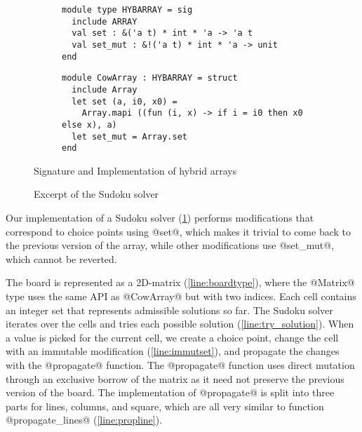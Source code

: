 \begin{figure}[tp]
  \centering
  \begin{subfigure}[t]{0.45\linewidth}
\begin{lstlisting}
module type HYBARRAY = sig
  include ARRAY
  val set : &('a t) * int * 'a -> 'a t
  val set_mut : &!('a t) * int * 'a -> unit
end
\end{lstlisting}
  \end{subfigure}\hfill
  \begin{subfigure}[t]{0.55\linewidth}
\begin{lstlisting}
module CowArray : HYBARRAY = struct
  include Array
  let set (a, i0, x0) =
    Array.mapi ((fun (i, x) -> if i = i0 then x0 else x), a)
  let set_mut = Array.set
end
\end{lstlisting}
  \end{subfigure}
  \vspace{-15pt}
  \caption{Signature and Implementation of hybrid arrays}
  \label{sig:hybarray}
  \label{ex:cow}

  \begin{subfigure}[t]{0.45\linewidth}
  
  \end{subfigure}\hfill
  \begin{subfigure}[t]{0.55\linewidth}
  
  \end{subfigure}
  \vspace{-15pt}
  \caption{Excerpt of the Sudoku solver}
  \label{ex:sudoku}
\end{figure}

Our implementation of a Sudoku solver (\cref{ex:sudoku}) performs
modifications that correspond to choice points using @set@,
which makes it trivial to come back to the previous version
of the array, while other modifications use @set_mut@, which
cannot be reverted.

The board is represented as a 2D-matrix (\cref{line:boardtype}), where
the @Matrix@ type uses the same API as @CowArray@
but with two indices.
Each cell contains an integer set that represents admissible solutions so far.
The Sudoku solver iterates over the cells and tries each possible solution (\cref{line:try_solution}).
When a value is picked for the current cell, we create a choice point,
change the cell with an immutable modification (\cref{line:immutset}), and propagate
the changes with the @propagate@ function.
The @propagate@ function uses direct mutation through an
exclusive borrow of the matrix as it need not preserve the previous
version of the board.
The implementation of @propagate@ is split into three parts
for lines, columns, and square, which are all very similar to function
@propagate_lines@ (\cref{line:propline}).

